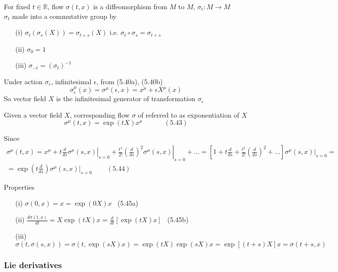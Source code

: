 \documentclass[twoside]{amsart}
\begin{document}
For fixed $t\in \mathbb{R}$, flow $\sigma(t,x)$ is a diffeomorphism from $M$ to $M$, $\sigma_t : M \to M$ \\
$\sigma_t$ made into a commutative group by 
\begin{enumerate}
\item[(i)] $\sigma_t(\sigma_s(X)) = \sigma_{t+s}(X)$ i.e. $\sigma_t \circ \sigma_s = \sigma_{t+s}$ 
\item[(ii)] $\sigma_0 = 1$ 
\item[(iii)] $\sigma_{-t} = (\sigma_t)^{-1}$
\end{enumerate}

Under action $\sigma_{\epsilon}$, infinitesimal $\epsilon$, from (5.40a), (5.40b)
\[
\sigma_{\epsilon}^{\mu}(x) = \sigma^{\mu}(\epsilon, x) = x^{\mu} + \epsilon X^{\mu}(x)
\]
So vector field $X$ is the infinitesimal generator of transformation $\sigma_{\epsilon}$

Given a vector field $X$, corresponding flow $\sigma$ of referred to as exponentiation of $X$
\[
\sigma^{\mu}(t,x) = \exp{ (tX) } x^{\mu} \quad \quad \quad \, (5.43)
\]

Since 
\[
\begin{gathered}
\sigma^{\mu}(t,x) = x^{\mu} + t \left. \frac{d}{ds} \sigma^{\mu}(s,x) \right|_{s=0} + \frac{t^2}{2!} \left. \left( \frac{d}{ds} \right)^2 \sigma^{\mu}(s,x) \right|_{s=0} + \dots = \left[ 1 + t \frac{d}{ds} + \frac{t^2}{2!} \left( \frac{d}{ds} \right)^2 + \dots \right] \left. \sigma^{\mu}(s,x) \right|_{s=0} = \\
= \exp{ \left( t \frac{d}{ds} \right) } \left. \sigma^{\mu}(s,x) \right|_{s =0 } \quad \quad \, (5.44) 
\end{gathered}
\]

Properties
\begin{enumerate}
\item[(i)] $\sigma(0,x) = x = \exp{ ( 0X) } x $ \quad \quad \quad \, (5.45a) 
\item[(ii)] $\frac{ d\sigma (t,x) }{ dt} = X\exp{(tX)}x = \frac{d}{dt} [ \exp{ (tX) } x ]$ \quad \quad \quad \, (5.45b)
\item[(iii)] $\sigma(t,\sigma(s,x) ) = \sigma(t, \exp{(sX)} x) = \exp{ (tX)} \exp{(sX) }x = \exp{ [ (t+s) X ] }x = \sigma(t+s,x)$
\end{enumerate}

\subsubsection{ Lie derivatives } 
\end{document}
